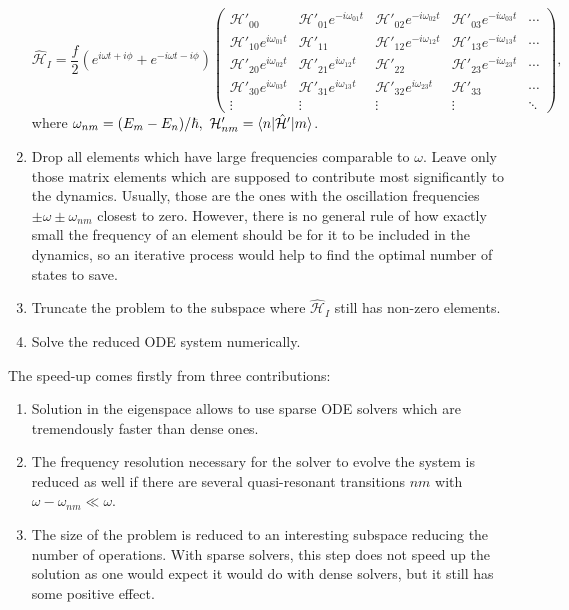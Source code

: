 \begin{enumerate}
\begin{equation*}
\hat{\mathcal{H}}_I = \frac{f}{2}(e^{i\omega t +i\phi}+e^{-i\omega t - i\phi})
\left(
\begin{matrix}
\mathcal{H}'_{00}      & \mathcal{H}'_{01}e^{-i\omega_{01} t} & \mathcal{H}'_{02} e^{-i\omega_{02} t}        & \mathcal{H}'_{03}e^{-i\omega_{03}t} & \cdots\\
\mathcal{H}'_{10}e^{i\omega_{01}t} & \mathcal{H}'_{11}     & \mathcal{H}'_{12}e^{-i\omega_{12}t} & \mathcal{H}'_{13}e^{-i\omega_{13}t}         & \cdots\\
\mathcal{H}'_{20}e^{i\omega_{02}t}   & \mathcal{H}'_{21}e^{i\omega_{12}t}  & \mathcal{H}'_{22}         & \mathcal{H}'_{23}e^{-i\omega_{23}t} & \cdots\\
\mathcal{H}'_{30}e^{i\omega_{03}t} & \mathcal{H}'_{31} e^{i\omega_{13}t}    & \mathcal{H}'_{32}e^{i\omega_{23}t} &       \mathcal{H}'_{33}   & \cdots\\
\vdots&\vdots&\vdots&\vdots& \ddots
\end{matrix}
\right),
\end{equation*}
where $\omega_{nm} = (E_m-E_n)/\hbar,\ \mathcal{H}'_{nm} = \langle n\rvert\hat{\mathcal{H}}'\lvert m\rangle$.

\item Drop all elements which have large frequencies comparable to $\omega$. Leave only those matrix elements which are supposed to contribute most significantly to the dynamics. Usually, those are the ones with the oscillation frequencies $\pm\omega\pm\omega_{nm}$ closest to zero. However, there is no general rule of how exactly small the frequency of an element should be for it to be included in the dynamics, so an iterative process would help to find the optimal number of states to save.

\item Truncate the problem to the subspace where $\hat{\mathcal H}_I$ still has non-zero elements. 

\item Solve the reduced ODE system numerically.
\end{enumerate}

The speed-up comes firstly from three contributions:
\begin{enumerate}
\item Solution in the eigenspace allows to use sparse ODE solvers which are tremendously faster than dense ones.
\item The frequency resolution necessary for the solver to evolve the system is reduced as well if there are several quasi-resonant transitions $nm$ with $\omega - \omega_{nm}\ll \omega$.
\item The size of the problem is reduced to an interesting subspace reducing the number of operations. With sparse solvers, this step does not speed up the solution as one would expect it would do with dense solvers, but it still has some positive effect.
\end{enumerate}

